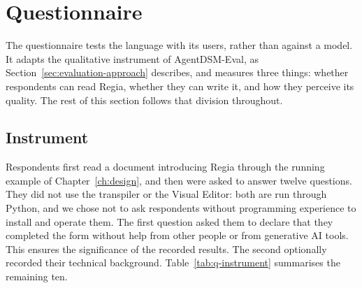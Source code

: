 \section{Questionnaire}
\label{sec:questionnaire}

The questionnaire tests the language with its users, rather than against a model. It adapts the qualitative instrument of AgentDSM-Eval, as Section~\ref{sec:evaluation-approach} describes, and measures three things: whether respondents can read Regia, whether they can write it, and how they perceive its quality. The rest of this section follows that division throughout.

\subsection{Instrument}
\label{sec:q-instrument}
 
Respondents first read a document introducing Regia through the running example of Chapter~\ref{ch:design}, and then were asked to answer twelve questions. They did not use the transpiler or the Visual Editor: both are run through Python, and we chose not to ask respondents without programming experience to install and operate them. The first question asked them to declare that they completed the form without help from other people or from generative AI tools. This ensures the significance of the recorded results. The second optionally recorded their technical background. Table~\ref{tab:q-instrument} summarises the remaining ten.
 
